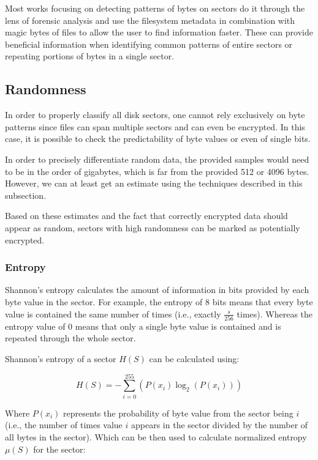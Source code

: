 \documentclass[
  digital, %
  color,   %
  oneside, %
  lof,     %
  nolot,     %
]{fithesis4}
\begin{document}
Most works focusing on detecting patterns of bytes on sectors\cite{foster12, garfmccar15} do it through the lens of forensic analysis and use the filesystem metadata in combination with magic bytes of files to allow the user to find information faster.
These can provide beneficial information when identifying common patterns of entire sectors or repeating portions of bytes in a single sector.\cite{foster12}

\subsection{Randomness}
\label{ssec:randomness}
In order to properly classify all disk sectors, one cannot rely exclusively on byte patterns since files can span multiple sectors and can even be encrypted.
In this case, it is possible to check the predictability of byte values or even of single bits.

In order to precisely differentiate random data, the provided samples would need to be in the order of gigabytes, which is far from the provided 512 or 4096 bytes.
However, we can at least get an estimate using the techniques described in this subsection.

Based on these estimates and the fact that correctly encrypted data should appear as random, sectors with high randomness can be marked as potentially encrypted.

\subsubsection{Entropy}
\label{sss:entropy}
Shannon's entropy calculates the amount of information in bits provided by each byte value in the sector.\cite{shannon48}
For example, the entropy of 8 bits means that every byte value is contained the same number of times (i.e., exactly $\frac{s}{256}$ times).
Whereas the entropy value of 0 means that only a single byte value is contained and is repeated through the whole sector. 

Shannon's entropy of a sector $H(S)$ can be calculated using:

\begin{equation}
  H(S) = -\sum_{i=0}^{255}(P(x_i)\log_2(P(x_i)))
  \label{eq:entropy}
\end{equation}

Where $P(x_i)$ represents the probability of byte value from the sector being $i$ (i.e., the number of times value $i$ appears in the sector divided by the number of all bytes in the sector). 
Which can be then used to calculate normalized entropy $\mu(S)$ for the sector:
\end{document}
